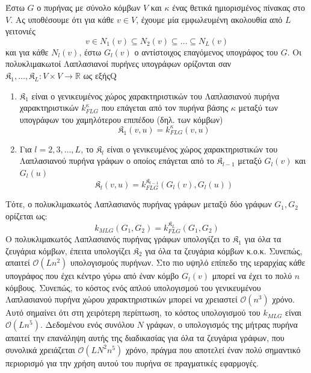 Έστω $G$ ο πυρήνας με σύνολο κόμβων $V$ και $\kappa$ ένας θετικά ημιορισμένος πίνακας στο $V$.
Ας υποθέσουμε ότι για κάθε $v \in V$, έχουμε μία εμφωλευμένη ακολουθία από $L$ γειτονιές
\begin{equation}
    v \in N_1(v) \subseteq N_2(v) \subseteq \ldots \subseteq N_L(v)
\end{equation}
και για κάθε $N_l(v)$, έστω $G_l(v)$ ο αντίστοιχος επαγόμενος υπογράφος του $G$.
Οι πολυκλιμακωτοί Λαπλασιανοί πυρήνες υπογράφων ορίζονται σαν $\mathfrak{K}_1, \ldots, \mathfrak{K}_L : V \times V \rightarrow \mathbb{R}$ ως εξήςQ
\begin{enumerate}
    \item $\mathfrak{K}_1$ είναι ο γενικευμένος χώρος χαρακτηριστικών του Λαπλασιανού πυρήνα χαρακτηριστικών $k_{FLG}^\kappa$ που επάγεται από τον πυρήνα βάσης $\kappa$ μεταξύ των υπογράφων του χαμηλότερου επιπέδου (δηλ. των κόμβων)
    \begin{equation}
        \mathfrak{K}_1(v,u) = k_{FLG}^\kappa(v, u)
    \end{equation}
    \item Για $l=2,3,\ldots,L$, το $\mathfrak{K}_l$ είναι ο γενικευμένος χώρος χαρακτηριστικών  του Λαπλασιανού πυρήνα γράφων ο οποίος επάγεται από το  $\mathfrak{K}_{l-1}$ μεταξύ  $G_l(v)$ και $G_l(u)$
    \begin{equation}
        \mathfrak{K}_l(v,u) = k_{FLG}^{\mathfrak{K}_{l-1}}(G_l(v), G_l(u))
    \end{equation}
\end{enumerate}
Τότε, ο πολυκλιμακωτός Λαπλασιανός πυρήνας γράφων μεταξύ δύο γράφων $G_1, G_2$ ορίζεται ως:
\begin{equation}
    k_{MLG}(G_1, G_2) = k_{FLG}^{\mathfrak{K}_L}(G_1, G_2)
\end{equation}
Ο πολυκλιμακωτός Λαπλασιανός πυρήνας γράφων υπολογίζει το $\mathfrak{K}_1$ για όλα τα ζευγάρια κόμβων, έπειτα υπολογίζει $\mathfrak{K}_2$ για όλα τα ζευγάρια κόμβων κ.ο.κ.
Συνεπώς, απαιτεί $\mathcal{O}(Ln^2)$ υπολογισμούς πυρήνων.
Στο πιο υψηλό επίπεδο της ιεραρχίας κάθε υπογράφος που έχει κέντρο γύρω από έναν κόμβο $G_l(v)$ μπορεί να έχει το πολύ $n$ κόμβους.
Συνεπώς, το κόστος ενός απλού υπολογισμού του γενικευμένου Λαπλασιανού πυρήνα χώρου χαρακτηριστικών μπορεί να χρειαστεί $\mathcal{O}(n^3)$ χρόνο.
Αυτό σημαίνει ότι στη χειρότερη περίπτωση, το κόστος υπολογισμού του $k_{MLG}$ είναι $\mathcal{O}(Ln^5)$.
Δεδομένου ενός συνόλου $N$ γράφων, ο υπολογισμός της μήτρας πυρήνα απαιτεί την επανάληψη αυτής της διαδικασίας για όλα τα ζευγάρια γράφων, που συνολικά χρειάζεται $\mathcal{O}(LN^2n^5)$ χρόνο, πράγμα που αποτελεί έναν πολύ σημαντικό περιορισμό για την χρήση αυτού του πυρήνα σε πραγματικές εφαρμογές.\par
